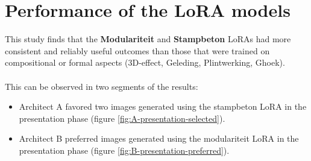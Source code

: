 
\section{Performance of the LoRA models}

This study finds that the \textbf{Modulariteit} and \textbf{Stampbeton} LoRAs had more consistent and reliably useful outcomes than those that were trained on compositional or formal aspects (3D-effect, Geleding, Plintwerking, Ghoek).\\~\\
This can be observed in two segments of the results:
\begin{itemize}
    \item Architect A favored two images generated using the stampbeton LoRA in the presentation phase (figure \ref{fig:A-presentation-selected}).
    \item Architect B preferred images generated using the modulariteit LoRA in the presentation phase (figure \ref{fig:B-presentation-preferred}).
\end{itemize}

